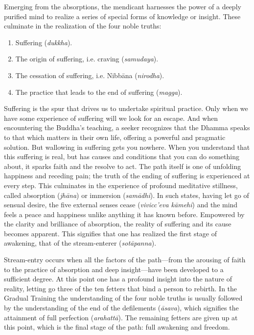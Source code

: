 \documentclass[12pt,openany]{book}%
\begin{document}
Emerging from the absorptions, the mendicant harnesses the power of a deeply purified mind to realize a series of special forms of knowledge or insight. These culminate in the realization of the four noble truths:

\begin{enumerate}%
\item Suffering (\textit{dukkha}).%
\item The origin of suffering, i.e. craving (\textit{samudaya}).%
\item The cessation of suffering, i.e. \textsanskrit{Nibbāna} (\textit{nirodha}).%
\item The practice that leads to the end of suffering (\textit{magga}).%
\end{enumerate}

Suffering is the spur that drives us to undertake spiritual practice. Only when we have some experience of suffering will we look for an escape. And when encountering the Buddha’s teaching, a seeker recognizes that the Dhamma speaks to that which matters in their own life, offering a powerful and pragmatic solution. But wallowing in suffering gets you nowhere. When you understand that this suffering is real, but has causes and conditions that you can do something about, it sparks faith and the resolve to act. The path itself is one of unfolding happiness and receding pain; the truth of the ending of suffering is experienced at every step. This culminates in the experience of profound meditative stillness, called absorption (\textit{\textsanskrit{jhāna}}) or immersion (\textit{\textsanskrit{samādhi}}). In such states, having let go of sensual desire, the five external senses cease (\textit{vivicc’eva \textsanskrit{kāmehi}}) and the mind feels a peace and happiness unlike anything it has known before. Empowered by the clarity and brilliance of absorption, the reality of suffering and its cause becomes apparent. This signifies that one has realized the first stage of awakening, that of the stream-enterer (\textit{\textsanskrit{sotāpanna}}).

Stream-entry occurs when all the factors of the path—from the arousing of faith to the practice of absorption and deep insight—have been developed to a sufficient degree. At this point one has a profound insight into the nature of reality, letting go three of the ten fetters that bind a person to rebirth. In the Gradual Training the understanding of the four noble truths is usually followed by the understanding of the end of the defilements (\textit{\textsanskrit{āsava}}), which signifies the attainment of full perfection (\textit{\textsanskrit{arahattā}}). The remaining fetters are given up at this point, which is the final stage of the path: full awakening and freedom.
\end{document}
